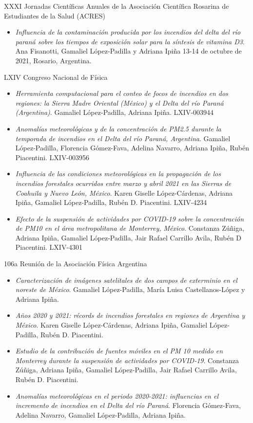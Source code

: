 \documentclass[12pt,letterpaper]{article}
\begin{document}
XXXI Jornadas Científicas Anuales de la Asociación Científica Rosarina de Estudiantes de la Salud (ACRES)
\begin{itemize}[label={}]
    \item \textit{Influencia de la contaminación producida por los incendios del delta del río paraná sobre los tiempos de exposición solar para la síntesis de vitamina D3}. Ana Fisanotti, Gamaliel López-Padilla y Adriana Ipiña 13-14 de octubre de 2021, Rosario, Argentina.
\end{itemize}

LXIV Congreso Nacional de Física
\begin{itemize}[label={}]
    \item \textit{Herramienta computacional para el conteo de focos de incendios en dos regiones: la Sierra  Madre Oriental (México) y el Delta del río Paraná (Argentina)}. Gamaliel López-Padilla, Adriana Ipiña. LXIV-003944
    \item \textit{Anomalías meteorológicas y de la concentración de PM2.5 durante la temporada de incendios en el Delta del río Paraná, Argentina}. Gamaliel López-Padilla, Florencia Gómez-Fava, Adelina Navarro, Adriana Ipiña, Rubén Piacentini. LXIV-003956
    \item \textit{Influencia de las condiciones meteorológicas en la propagación de los incendios forestales ocurridos entre marzo y abril 2021 en las Sierras de Coahuila y Nuevo León, México}. Karen Giselle López-Cárdenas, Adriana Ipiña, Gamaliel López-Padilla, Rubén D. Piacentini. LXIV-4234
    \item \textit{Efecto de la suspensión de actividades por COVID-19 sobre la concentración de PM10 en el área metropolitana de Monterrey, México}. Constanza Zúñiga, Adriana Ipiña, Gamaliel López-Padilla, Jair Rafael Carrillo Avila, Rubén D Piacentini. LXIV-4301
\end{itemize}

106a Reunión de la Asociación Física Argentina
\begin{itemize}[label={}]
    \item \textit{Caracterización de imágenes satelitales de dos campos de exterminio en el noreste de México}. Gamaliel López-Padilla, María Luisa Castellanos-López y Adriana Ipiña.
    \item \textit{Años 2020 y 2021: récords de incendios forestales en regiones de Argentina y México}. Karen Giselle López-Cárdenas, Adriana Ipiña, Gamaliel López-Padilla, Rubén D. Piacentini.
    \item \textit{Estudio de la contribución de fuentes móviles en el PM 10 medido en Monterrey durante la suspensión de actividades por COVID-19}. Constanza Zúñiga, Adriana Ipiña, Gamaliel López-Padilla, Jair Rafael Carrillo Avila, Rubén D. Piacentini.
    \item \textit{Anomalías meteorológicas en el periodo 2020-2021: influencias en el incremento de incendios en el Delta del río Paraná}. Florencia Gómez-Fava, Adelina Navarro, Gamaliel López-Padilla, Adriana Ipiña.
\end{itemize}
\end{document}
